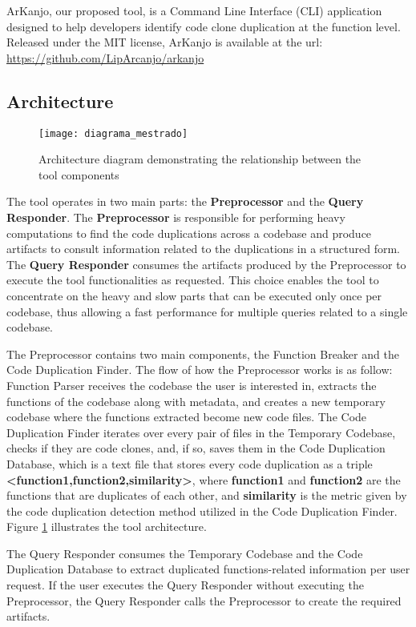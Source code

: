 \documentclass[conference]{IEEEtran}
\begin{document}
ArKanjo, our proposed tool, is a Command Line Interface (CLI) application designed to
help developers identify code clone duplication at the function level. Released under the
MIT license, ArKanjo is available at the url: \url{https://github.com/LipArcanjo/arkanjo}

\subsection{Architecture}

\begin{figure}[!t]
\centering
\texttt{[image: diagrama\_mestrado]}
\caption{Architecture diagram demonstrating the relationship between the tool components}
\label{fig:diagram}
\end{figure}

The tool operates in two main parts: the \textbf{Preprocessor} and the \textbf{Query Responder}. 
The \textbf{Preprocessor} is responsible for performing heavy computations to find the code 
duplications across a codebase and produce artifacts to consult information related to the 
duplications in a structured form. The \textbf{Query Responder} consumes the artifacts produced 
by the Preprocessor to execute the tool functionalities as requested. This choice enables the 
tool to concentrate on the heavy and slow parts that can be executed only once per codebase, 
thus allowing a fast performance for multiple queries related to a single codebase.

The Preprocessor contains two main components, the Function Breaker and the Code Duplication Finder. 
The flow of how the Preprocessor works is as follow: Function Parser receives the codebase the user is interested in,
extracts the functions of the codebase along with metadata, and creates a new temporary codebase where the functions extracted become new code files. 
The Code Duplication Finder iterates over every pair of files in the Temporary Codebase, checks if they are code clones, and, 
if so, saves them in the Code Duplication Database, which is a text file that stores every code duplication as a triple 
\textbf{<function1,function2,similarity>}, where \textbf{function1} and \textbf{function2} are the functions that are duplicates 
of each other, and \textbf{similarity} is the metric given by the code duplication detection method utilized in the Code Duplication Finder.
Figure \ref{fig:diagram} illustrates the tool architecture.

The Query Responder consumes the Temporary Codebase and the Code Duplication Database to extract duplicated 
functions-related information per user request. If the user executes the Query Responder without executing the 
Preprocessor, the Query Responder calls the Preprocessor to create the required artifacts.
\end{document}
